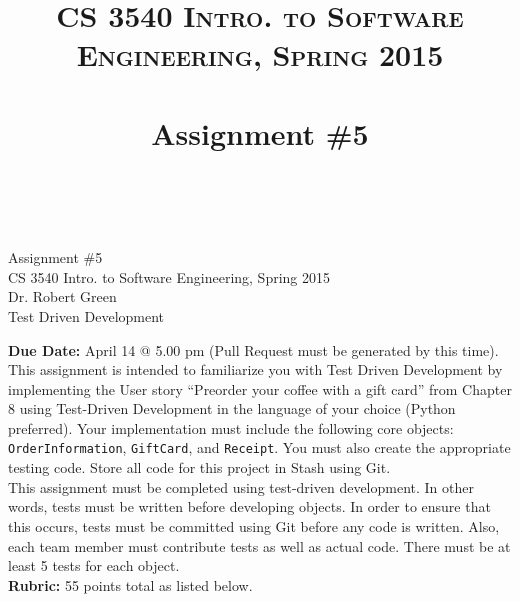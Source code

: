\documentclass[paper=letter, fontsize=11pt]{scrartcl} %
\title{ 
    \normalfont \normalsize 
    \textsc{CS 3540 Intro. to Software Engineering, Spring 2015} \\ [25pt] %
    \horrule{0.5pt} \\[0.4cm] %
    \huge Assignment \#5    \\ %
    \horrule{2pt} \\[0.5cm] %
}
\begin{document}
    \begin{center}
         Assignment \#5\\
        \small CS 3540 Intro. to Software Engineering, Spring 2015 \\
        \small Dr. Robert Green \\
        \huge Test Driven Development
    \end{center}
    
    \textbf{Due Date:} April 14 @ 5.00 pm (Pull Request must be generated by this time). \\

    This assignment is intended to familiarize you with Test Driven Development by implementing the User story ``Preorder your coffee with a gift card'' from Chapter 8 using Test-Driven Development in the language of your choice (Python preferred). Your implementation must include the following core objects: \texttt{OrderInformation}, \texttt{GiftCard}, and \texttt{Receipt}. You must also create the appropriate testing code. Store all code for this project in Stash using Git. \\

    This assignment must be completed using test-driven development. In other words, tests must be written before developing objects. In order to ensure that this occurs, tests must be committed using Git before any code is written. Also, each team member must contribute tests as well as actual code. There must be at least 5 tests for each object.\\
    
    \textbf{Rubric:} 55 points total as listed below. 
    
\end{document}
